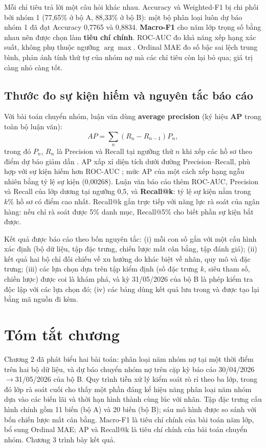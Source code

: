 Mỗi chỉ tiêu trả lời một câu hỏi khác nhau. Accuracy và Weighted-F1 bị chi phối bởi nhóm 1 (77,65\% ở bộ A, 88,33\% ở bộ B): một bộ phân loại luôn dự báo nhóm 1 đã đạt Accuracy 0,7765 và 0,8834. \textbf{Macro-F1} cho năm lớp trọng số bằng nhau nên được chọn làm \textbf{tiêu chí chính}. ROC-AUC đo khả năng xếp hạng xác suất, không phụ thuộc ngưỡng $\arg\max$. Ordinal MAE đo số bậc sai lệch trung bình, phản ánh tính thứ tự của nhóm nợ mà các chỉ tiêu còn lại bỏ qua; giá trị càng nhỏ càng tốt.

\subsection{Thước đo sự kiện hiếm và nguyên tắc báo cáo}
\label{sec:metrics-rare}
\label{sec:reporting-principles}

Với bài toán chuyển nhóm, luận văn dùng \textbf{average precision} (ký hiệu \textbf{AP} trong toàn bộ luận văn):
\[
AP=\sum_n (R_n-R_{n-1})P_n,
\]
trong đó $P_n$, $R_n$ là Precision và Recall tại ngưỡng thứ $n$ khi xếp các hồ sơ theo điểm dự báo giảm dần \cite{sklearn_ap_docs}. AP xấp xỉ diện tích dưới đường Precision--Recall, phù hợp với sự kiện hiếm hơn ROC-AUC \cite{saito2015precision}; mức AP của một cách xếp hạng ngẫu nhiên bằng tỷ lệ sự kiện (0,00268). Luận văn báo cáo thêm ROC-AUC, Precision và Recall của lớp dương tại ngưỡng 0,5, và \textbf{Recall@k}: tỷ lệ sự kiện nằm trong $k\%$ hồ sơ có điểm cao nhất. Recall@k gắn trực tiếp với năng lực rà soát của ngân hàng: nếu chỉ rà soát được 5\% danh mục, Recall@5\% cho biết phần sự kiện bắt được.

Kết quả được báo cáo theo bốn nguyên tắc: (i) mỗi con số gắn với một cấu hình xác định (bộ dữ liệu, tập đặc trưng, chiến lược mất cân bằng, tập đánh giá); (ii) kết quả hai bộ chỉ đối chiếu về xu hướng do khác biệt về nhãn, quy mô và đặc trưng; (iii) các lựa chọn dựa trên tập kiểm định (số đặc trưng $k$, siêu tham số, chiến lược) được coi là khám phá, và kỳ 31/05/2026 của bộ B là phép kiểm tra độc lập với các lựa chọn đó; (iv) các bảng dùng kết quả lưu trong  và được tạo lại bằng mã nguồn đi kèm.

\section*{Tóm tắt chương}

Chương 2 đã phát biểu hai bài toán: phân loại năm nhóm nợ tại một thời điểm trên hai bộ dữ liệu, và dự báo chuyển nhóm nợ trên cặp kỳ báo cáo 30/04/2026$\to$31/05/2026 của bộ B. Quy trình tiền xử lý kiểm soát rò rỉ theo ba lớp, trong đó lớp rà soát cuối cho thấy một phần đáng kể hiệu năng phân loại năm nhóm dựa vào các biến lãi và thời hạn hình thành cùng lúc với nhãn. Tập đặc trưng cấu hình chính gồm 11 biến (bộ A) và 20 biến (bộ B); sáu mô hình được so sánh với bốn chiến lược mất cân bằng. Macro-F1 là tiêu chí chính của bài toán năm lớp, bổ sung Ordinal MAE; AP và Recall@k là tiêu chí chính của bài toán chuyển nhóm. Chương 3 trình bày kết quả.
